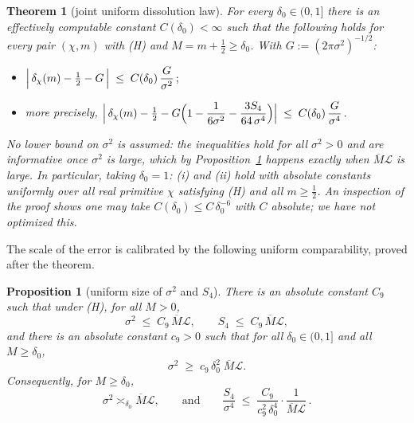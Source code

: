 \documentclass[11pt]{article}
\newtheorem{theorem}{Theorem}
\newtheorem{proposition}{Proposition}
\begin{document}
\begin{theorem}[joint uniform dissolution law]\label{thm:joint}
For every $\delta_0\in(0,1]$ there is an effectively computable
constant $C(\delta_0)<\infty$ such that the following holds for
\emph{every} pair $(\chi,m)$ with (H) and $M=m+\tfrac12\ge\delta_0$.
With $G:=(2\pi\sigma^2)^{-1/2}$:
\begin{itemize}
\item[(i)]
$\displaystyle
\Bigl|\,\delta_\chi(m)-\tfrac12-G\,\Bigr|
\;\le\;C(\delta_0)\,\frac{G}{\sigma^{2}}\,;
$
\item[(ii)] more precisely,
$\displaystyle
\Bigl|\,\delta_\chi(m)-\tfrac12
-G\Bigl(1-\frac{1}{6\sigma^{2}}-\frac{3S_4}{64\,\sigma^{4}}\Bigr)
\Bigr|
\;\le\;C(\delta_0)\,\frac{G}{\sigma^{4}}\,.
$
\end{itemize}
No lower bound on $\sigma^2$ is assumed: the inequalities hold for all
$\sigma^2>0$ and are informative once $\sigma^2$ is large, which by
Proposition~\ref{prop:sigcomp} happens exactly when
$\overline M\mathcal L$ is large. In particular, taking $\delta_0=1$:
(i) and (ii) hold \emph{with absolute constants} uniformly over all
real primitive $\chi$ satisfying (H) and all $m\ge\tfrac12$. An
inspection of the proof shows one may take
$C(\delta_0)\le C\,\delta_0^{-6}$ with $C$ absolute; we have not
optimized this.
\end{theorem}

The scale of the error is calibrated by the following uniform
comparability, proved after the theorem.

\begin{proposition}[uniform size of $\sigma^2$ and $S_4$]
\label{prop:sigcomp}
There is an absolute constant $C_9$ such that under (H), for all
$M>0$,
\begin{equation}\label{eq:sigup}
\sigma^{2}\;\le\;C_9\,\overline M\mathcal L,
\qquad
S_4\;\le\;C_9\,\overline M\mathcal L ,
\end{equation}
and there is an absolute constant $c_9>0$ such that for all
$\delta_0\in(0,1]$ and all $M\ge\delta_0$,
\begin{equation}\label{eq:siglow}
\sigma^{2}\;\ge\;c_9\,\delta_0^{2}\;\overline M\mathcal L .
\end{equation}
Consequently, for $M\ge\delta_0$,
\begin{equation}\label{eq:lindeberg}
\sigma^2\asymp_{\delta_0}\overline M\mathcal L,
\qquad\text{and}\qquad
\frac{S_4}{\sigma^{4}}
\;\le\;\frac{C_9}{c_9^{2}\,\delta_0^{4}}\cdot
\frac{1}{\overline M\mathcal L}\,.
\end{equation}
\end{proposition}
\end{document}
